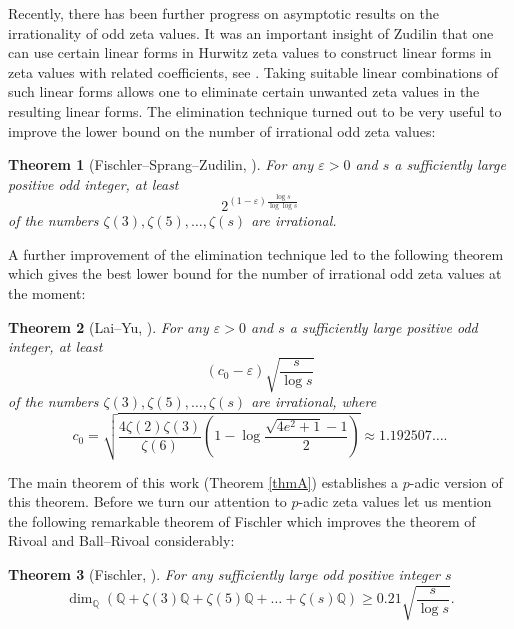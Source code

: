 \documentclass[12pt]{article}
\newtheorem*{theorem*}{Theorem}
\numberwithin{equation}{section}
\begin{document}
Recently, there has been further progress on asymptotic results on the irrationality of odd zeta values. It was an important insight of Zudilin that one can use certain linear forms in Hurwitz zeta values to construct linear forms in zeta values with related coefficients, see \cite{Zud18}. Taking suitable linear combinations of such linear forms allows one to eliminate certain unwanted zeta values in the resulting linear forms. The elimination technique turned out to be very useful to improve the lower bound on the number of irrational odd zeta values:
\begin{theorem*}[Fischler--Sprang--Zudilin, \cite{FSZ2019}]
	For any $\varepsilon>0$ and $s$ a sufficiently large positive odd integer,  at least
	\[
		2^{(1-\varepsilon)\frac{\log s}{\log\log s}}
	\]
	of the numbers $\zeta(3),\zeta(5),\dots,\zeta(s)$ are irrational. 
\end{theorem*}
A further improvement of the elimination technique led to the following theorem which gives the best lower bound for the number of irrational odd zeta values at the moment:
\begin{theorem*}[Lai--Yu, \cite{LY2020}]
	For any $\varepsilon>0$ and $s$ a sufficiently large positive odd integer,  at least
	\[
		\left(c_0 -\varepsilon\right)\sqrt{\frac{s}{\log s}}
	\]
	of the numbers $\zeta(3),\zeta(5),\dots,\zeta(s)$ are irrational, where
	\[
		c_0=\sqrt{\frac{4\zeta(2)\zeta(3)}{\zeta(6)}\left( 1-\log \frac{\sqrt{4e^2+1}-1}{2}\right)}\approx 1.192507\dots. 
	\]
\end{theorem*}
The main theorem of this work (Theorem \ref{thmA}) establishes a $p$-adic version of this theorem. Before we turn our attention to $p$-adic zeta values let us mention the following remarkable theorem of Fischler which improves the theorem of Rivoal and Ball--Rivoal considerably:
\begin{theorem*}[Fischler, \cite{Fis21}]
	For any sufficiently large odd positive integer $s$
	\[
		\dim_{\mathbb{Q}} \left( \mathbb{Q}+ \zeta(3)\mathbb{Q}+ \zeta(5)\mathbb{Q}+\dots + \zeta(s)\mathbb{Q} \right)\geqslant 0.21\sqrt{\frac{s}{\log s}}.
	\]
\end{theorem*}
\end{document}
